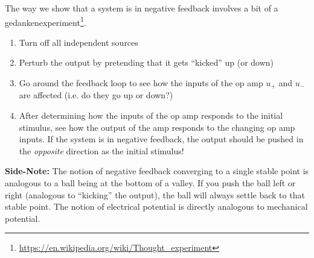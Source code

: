
The way we show that a system is in negative feedback involves a bit of a gedankenexperiment\footnote{\url{https://en.wikipedia.org/wiki/Thought_experiment}}.
\begin{enumerate}
	\item Turn off all independent sources
	\item Perturb the output by pretending that it gets ``kicked'' up (or down)
	\item Go around the feedback loop to see how the inputs of the op amp $u_+$ and $u_-$ are affected (i.e. do they go up or down?)
	\item After determining how the inputs of the op amp responds to the initial stimulus, see how the output of the amp responds to the changing op amp inputs. If the system is in negative feedback, the output should be pushed in the \textit{opposite} direction as the initial stimulus! 
\end{enumerate}

\textbf{Side-Note:}
The notion of negative feedback converging to a single stable point is analogous to a ball being at the bottom of a valley. If you push the ball left or right (analogous to ``kicking'' the output), the ball will always settle back to that stable point. The notion of electrical potential is directly analogous to mechanical potential.
\empt{\newpage}

